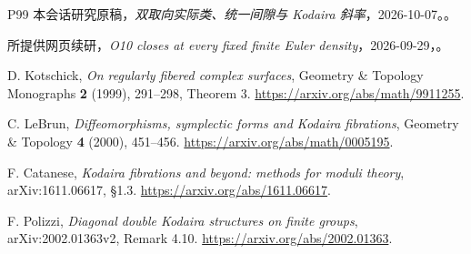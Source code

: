 \documentclass[UTF8,11pt,fontset=none]{ctexart}
\begin{document}
\begin{thebibliography}{P99}
\small
{} 本会话研究原稿，\emph{双取向实际类、统一间隙与 Kodaira 斜率}，2026-10-07。。

 所提供网页续研，\emph{O10 closes at every fixed finite Euler density}，2026-09-29，。

 D. Kotschick, \emph{On regularly fibered complex surfaces}, Geometry \& Topology Monographs \textbf{2} (1999), 291--298, Theorem 3. \url{https://arxiv.org/abs/math/9911255}.

 C. LeBrun, \emph{Diffeomorphisms, symplectic forms and Kodaira fibrations}, Geometry \& Topology \textbf{4} (2000), 451--456. \url{https://arxiv.org/abs/math/0005195}.

 F. Catanese, \emph{Kodaira fibrations and beyond: methods for moduli theory}, arXiv:1611.06617, §1.3. \url{https://arxiv.org/abs/1611.06617}.

 F. Polizzi, \emph{Diagonal double Kodaira structures on finite groups}, arXiv:2002.01363v2, Remark 4.10. \url{https://arxiv.org/abs/2002.01363}.

\end{thebibliography}
\end{document}

